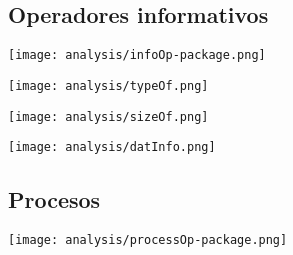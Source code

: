 
\subsection {Operadores informativos} 
\begin{center}
\texttt{[image: analysis/infoOp-package.png]} 
\end{center}

\begin{multicols}{2}
\begin{center}
\texttt{[image: analysis/typeOf.png]} 
\end{center}
\columnbreak
\begin{center}
\texttt{[image: analysis/sizeOf.png]} 
\end{center}
\end{multicols}

\begin{center}
\texttt{[image: analysis/datInfo.png]} 
\end{center}

\subsection {Procesos} 
\begin{center}
\texttt{[image: analysis/processOp-package.png]} 
\end{center}

